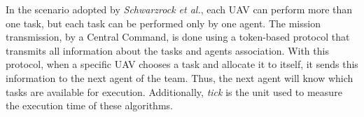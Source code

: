 In the scenario adopted by \textit{Schwarzrock et al.}\cite{MAS07}, each UAV can perform more than one task, but each task can be performed only by one agent. The mission transmission, by a Central Command, is done using a token-based protocol that transmits all information about the tasks and agents association. With this protocol, when a specific UAV chooses a task and allocate it to itself, it sends this information to the next agent of the team. Thus, the next agent will know which tasks are available for execution. Additionally, \textit{tick} is the unit used to measure the execution time of these algorithms.